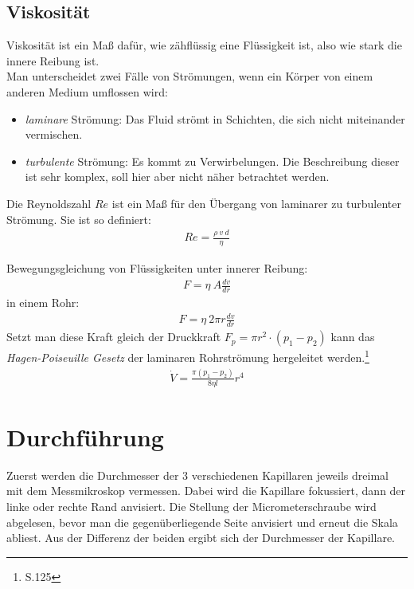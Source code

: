 \documentclass[12pt,a4paper,titlepage,headinclude,bibtotoc]{scrartcl}
\begin{document}
\subsection{Viskosität}
Viskosität ist ein Maß dafür, wie zähflüssig eine Flüssigkeit ist, also wie stark die innere Reibung ist.\\
Man unterscheidet zwei Fälle von Strömungen, wenn ein Körper von einem anderen Medium  umflossen wird:
\begin{itemize}
	\item \textit{laminare} Strömung: Das Fluid strömt in Schichten, die sich nicht miteinander vermischen. %
	\item \textit{turbulente} Strömung: Es kommt zu Verwirbelungen. Die Beschreibung dieser ist sehr komplex, soll hier aber nicht näher betrachtet werden.
\end{itemize}
Die Reynoldszahl $Re$ ist ein Maß für den Übergang von laminarer zu turbulenter Strömung.
Sie ist so definiert:
\begin{align}
	Re=\frac{\rho~v~d}{\eta}
\end{align}

Bewegungsgleichung von Flüssigkeiten unter innerer Reibung:
\begin{align}
	F=\eta~ A\frac{dv}{dr}
\end{align}
in einem Rohr:
\begin{align}
	F=\eta~ 2\pi r\frac{dv}{dr}
\end{align}
Setzt man diese Kraft gleich der Druckkraft $F_p=\pi r^2 \cdot (p_1-p_2)$ kann das \textit{Hagen-Poiseuille Gesetz} der laminaren Rohrströmung hergeleitet werden.\footnote{\cite{gerthsen} S.125} %
\begin{align}
	\dot{V}=\frac{\pi(p_1-p_2)}{8\eta l}r^4
\end{align}

\section{Durchführung}
\label{sec:durchfuehrung}
Zuerst werden die Durchmesser der 3 verschiedenen Kapillaren jeweils dreimal mit dem Messmikroskop vermessen.
Dabei wird die Kapillare fokussiert, dann der linke oder rechte Rand anvisiert.
Die Stellung der Micrometerschraube wird abgelesen, bevor man die gegenüberliegende Seite anvisiert und erneut die Skala abliest.
Aus der Differenz der beiden ergibt sich der Durchmesser der Kapillare.
\end{document}
